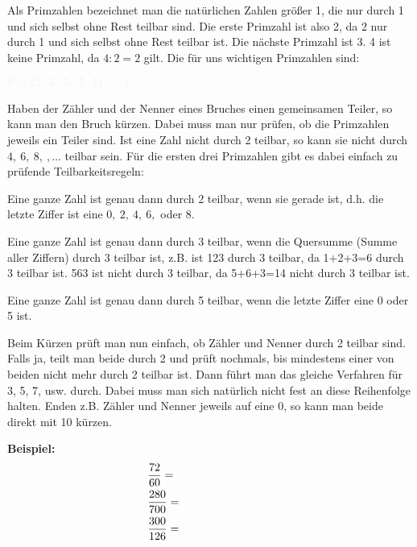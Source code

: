 \newpage
Als Primzahlen bezeichnet man die natürlichen Zahlen größer 1, die nur durch 1 und sich selbst ohne Rest teilbar sind. Die erste Primzahl ist also 2, da 2 nur durch 1 und sich selbst ohne Rest teilbar ist. Die nächste Primzahl ist 3. 4 ist keine Primzahl, da \(4:2=2\) gilt. Die für uns wichtigen Primzahlen sind:
\begin{tcolorbox}\centering
	\(\textcolor{loestc}{\mathbb{P}=\{2,\ 3,\ 5,\ 7,\ 11,\dots\}}\)
\end{tcolorbox}
Haben der Zähler und der Nenner eines Bruches einen gemeinsamen Teiler, so kann man den Bruch kürzen. Dabei muss man nur prüfen, ob die Primzahlen jeweils ein Teiler sind. Ist eine Zahl nicht durch 2 teilbar, so kann sie nicht durch \(4,\ 6,\ 8,\ ,\dots\) teilbar sein. Für die ersten drei Primzahlen gibt es dabei einfach zu prüfende Teilbarkeitsregeln:
\begin{tcolorbox}\centering
	\textcolor{loestc}{Eine ganze Zahl ist genau dann durch 2 teilbar, wenn sie gerade ist, d.h. die letzte Ziffer ist eine \(0,\ 2,\ 4,\ 6,\) oder  \(8\).}
\end{tcolorbox}
\begin{tcolorbox}\centering
	\textcolor{loestc}{Eine ganze Zahl ist genau dann durch 3 teilbar, wenn die Quersumme (Summe aller Ziffern) durch 3 teilbar ist, z.B. ist 123 durch 3 teilbar, da 1+2+3=6 durch 3 teilbar ist. 563 ist nicht durch 3 teilbar, da 5+6+3=14 nicht durch 3 teilbar ist.}
\end{tcolorbox}
\begin{tcolorbox}\centering
	\textcolor{loestc}{Eine ganze Zahl ist genau dann durch 5 teilbar, wenn die letzte Ziffer eine 0 oder 5 ist.}
\end{tcolorbox}
Beim Kürzen prüft man nun einfach, ob Zähler und Nenner durch 2 teilbar sind. Falls ja, teilt man beide durch 2 und prüft nochmals, bis mindestens einer von beiden nicht mehr durch 2 teilbar ist. Dann führt man das gleiche Verfahren für 3, 5, 7, usw. durch. Dabei muss man sich natürlich nicht fest an diese Reihenfolge halten. Enden z.B. Zähler und Nenner jeweils auf eine 0, so kann man beide direkt mit 10 kürzen.

\textbf{Beispiel:}
\begin{align*}
	&\frac{72}{60}=\textcolor{loes}{\frac{36}{30}=\frac{18}{15}=\frac{12}{15}=\frac{4}{5}}\\
	&\frac{280}{700}=\textcolor{loes}{\frac{28}{70}=\frac{14}{35}=\frac{2}{5}}\\
	&\frac{300}{126}=\textcolor{loes}{\frac{150}{63}=\frac{50}{21}}
\end{align*}

